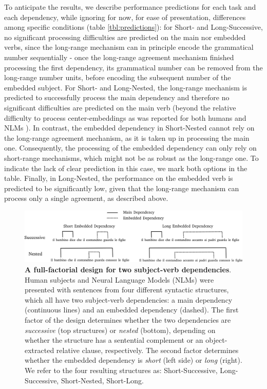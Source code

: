 To anticipate the results, we describe performance predictions for each task and each dependency, while ignoring for now, for ease of presentation, differences among specific conditions (table \ref{tbl:predictions}): for Short- and Long-Successive, no significant processing difficulties are predicted on the main nor embedded verbs, since the long-range mechanism can in principle encode the grammatical number sequentially - once the long-range agreement mechanism finished processing the first dependency, its grammatical number can be removed from the long-range number units, before encoding the subsequent number of the embedded subject. For Short- and Long-Nested, the long-range mechanism is predicted to successfully process the main dependency and therefore no significant difficulties are predicted on the main verb (beyond the relative difficulty to process center-embeddings as was reported for both humans \citep{traxler2002processing} and NLMs \citep{marvin2018targeted}). In contrast, the embedded dependency in Short-Nested cannot rely on the long-range agreement mechanism, as it is taken up in processing the main one. Consequently, the processing of the embedded dependency can only rely on short-range mechanisms, which might not be as robust as the long-range one. To indicate the lack of clear prediction in this case, we mark both options in the table. Finally, in Long-Nested, the performance on the embedded verb is predicted to be significantly low, given that the long-range mechanism can process only a single agreement, as described above. 




\begin{figure}
    \centering
    \includegraphics[width=\textwidth]{figures/design.png}
    \caption{\textbf{A full-factorial design for two subject-verb dependencies}. Human subjects and Neural Language Models (NLMs) were presented with sentences from four different syntactic structures, which all have two subject-verb dependencies: a main dependency (continuous lines) and an embedded dependency (dashed). The first factor of the design determines whether the two dependencies are \textit{successive} (top structures) or \textit{nested} (bottom), depending on whether the structure has a sentential complement or an object-extracted relative clause, respectively. The second factor determines whether the embedded dependency is \textit{short} (left side) or \textit{long} (right). We refer to the four resulting structures as: Short-Successive, Long-Successive, Short-Nested, Short-Long.}
    \label{fig:design}
\end{figure}

